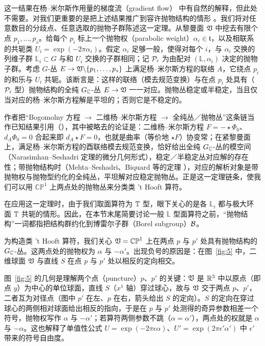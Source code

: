 这一结果在杨–米尔斯作用量的梯度流（gradient flow）\cite{ref52} 中有自然的解释，但此处不需要。对我们更重要的是把上述结果推广到容许抛物结构的情形 \cite{ref77}。我们将对任意数目的分歧点、任意选取的抛物子群陈述这一定理。从黎曼面 $\mathfrak{V}$ 中挖去有限个点 $p_1,\dots,p_s$。给每个 $p_i$ 标上一个抛物权（parabolic weight）$\alpha_i \in \mathfrak t$，以及相联系的共轭类 $U_i=\exp(-2\pi\alpha_i)$。假定 $\alpha_i$ 足够一般，使得对每个 $i$，与 $\alpha_i$ 交换的列维子群 $\mathbb{L}_i\subset G$ 与和 $U_i$ 交换的子群相同；记 ${\mathcal{P}}_i$ 为由配对 $(\mathbb{L},\alpha_i)$ 决定的抛物子群。考虑 $G$-丛 $E\to \mathfrak{V}\backslash
\{p_1,\dots,p_s\}$ 上满足杨–米尔斯方程的联络 $A$，它绕点 $p_i$ 的和乐与 $U_i$ 共轭。该断言是：这样的联络（模去规范变换）与在点 $p_i$ 处具有（$\mathcal{P}_i$ 型）抛物结构的全纯 $G_{\mathbb{C}}$-丛 $E\to \mathfrak{V}$ 一一对应。抛物丛稳定或半稳定，当且仅当对应的杨–米尔斯方程解是平坦的；否则它是不稳定的。
\begin{yizhu}[含糊点拨]
作者把“Bogomolny 方程 $\to$ 二维杨–米尔斯方程 $\to$ 全纯丛／抛物丛”这条链当作已知结果引用（\cite{ref51,ref52,ref77}），其中被略去的论证是：二维杨–米尔斯方程 $F=-\star\Phi_0$、$d_A\Phi_0=0$ 合起来即 $d_A\star F=0$，也就是曲率（等价地 $\star F$）协变常；在紧黎曼面上，满足杨–米尔斯方程的酉联络模去规范变换，恰好给出全纯 $G_{\mathbb{C}}$-丛的模空间（Narasimhan–Seshadri 定理的微分几何形式），稳定／半稳定丛对应解的存在性；带抛物结构时（Mehta–Seshadri、Biquard 等的定理 \cite{ref77}），对应的解析对象是带抛物权与抛物型约化的全纯丛，平坦解对应稳定抛物丛。正是这一定理链条，使我们可以用 $\mathbb{CP}^1$ 上两点处的抛物丛来分类类 't Hooft 算符。
\end{yizhu}

在应用这一定理时，由于我们取面算符为 ${\mathbb{T}}$ 型，眼下关心的是各 $\mathbb{L}_i$ 都与极大环面 ${\mathbb{T}}$ 共轭的情形。因此，在本节末尾简要讨论一般 $\mathbb{L}$ 型面算符之前，“抛物结构”一词都指把结构群约化到博雷尔子群（Borel subgroup）$\mathcal{B}$。

\bigskip{}

为构造类 't Hooft 算符，我们关心 $\mathfrak{V}=\mathbb{CP}^1$ 上在两点 $p$ 与 $p'$ 处具有抛物结构的 $G_{\mathbb{C}}$-丛。这两点处的抛物权为 $\alpha$ 与 $-\alpha'$。出现负号的原因是：在图~\ref{fig:5} 中，二维球面 $\mathfrak{V}$ 与直线 $S$ 在点 $p$ 与 $p'$ 处以相反的定向相交。
\begin{yizhu}[易错点]
图~\ref{fig:5} 的几何是理解两个点（puncture）$p$、$p'$ 的关键：$\mathfrak{V}$ 是 ${\mathbb{R}}^3$ 中以原点（即点 $y$）为中心的单位球面，直线 $S$（$x^1$ 轴）穿过球心，故与 $\mathfrak{V}$ 交于两点 $p$、$p'$，二者互为对径点（图中 $p'$ 在左、$p$ 在右，箭头给出 $S$ 的定向）。$S$ 的定向在穿过球心的两侧相对球面给出相反的指向，于是在 $p$ 与 $p'$ 处测得的奇异参数相差一个符号，抛物权写作 $\alpha$ 与 $-\alpha'$；若算符两侧参数不跳（$\alpha=\alpha'$），两点处的权就是 $\alpha$ 与 $-\alpha$。这也解释了单值性公式 $U=\exp(-2\pi\epsilon\alpha)$、$U'=\exp(2\pi\epsilon'\alpha')$ 中 $\epsilon'$ 带来的符号自由度。
\end{yizhu}

